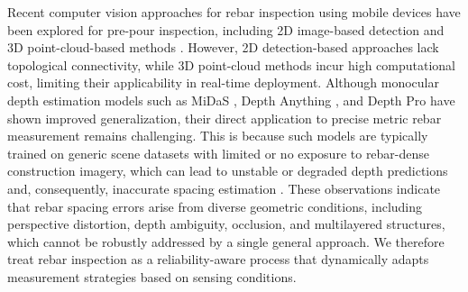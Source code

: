 \documentclass{article}
\begin{document}




Recent computer vision approaches for rebar inspection using mobile devices have been explored for pre-pour inspection, including 2D image-based detection \cite{2D_DL} \cite{BFMF-Net} and 3D point-cloud-based methods \cite{Hybrid_Perception}. However, 2D detection-based approaches lack topological connectivity, while 3D point-cloud methods incur high computational cost, limiting their applicability in real-time deployment. Although monocular depth estimation models such as MiDaS \cite{midas}, Depth Anything \cite{depth_anything}, and Depth Pro \cite{depth_pro} have shown improved generalization, their direct application to precise metric rebar measurement remains challenging. This is because such models are typically trained on generic scene datasets with limited or no exposure to rebar-dense construction imagery, which can lead to unstable or degraded depth predictions and, consequently, inaccurate spacing estimation \cite{mde_review_DL}.
These observations indicate that rebar spacing errors arise from diverse geometric conditions, including perspective distortion, depth ambiguity, occlusion, and multilayered structures, which cannot be robustly addressed by a single general approach. We therefore treat rebar inspection as a reliability-aware process that dynamically adapts measurement strategies based on sensing conditions.
\end{document}
